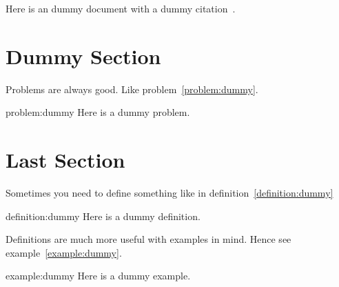 \documentclass[a4paper,ngerman,twoside,BCOR1.5cm,headsepline,DIV12,appendixprefix,final,12pt]{scrartcl}
\begin{document}
Here is an dummy document with a dummy citation~\cite{mam10eks.latexarchetype}.

\section{Dummy Section}

Problems are always good.
Like problem~\ref{problem:dummy}.

\begin{problem}[Dummy...]{problem:dummy}
Here is a dummy problem.
\end{problem}

\section{Last Section}

Sometimes you need to define something like in definition~\ref{definition:dummy}

\begin{bemerkung}[Dummy...]{definition:dummy}
Here is a dummy definition.
\end{bemerkung}


Definitions are much more useful with examples in mind.
Hence see example~\ref{example:dummy}.

\begin{example}[Dummy...]{example:dummy}
Here is a dummy example.
\end{example}


\newpage
{}


\end{document}
